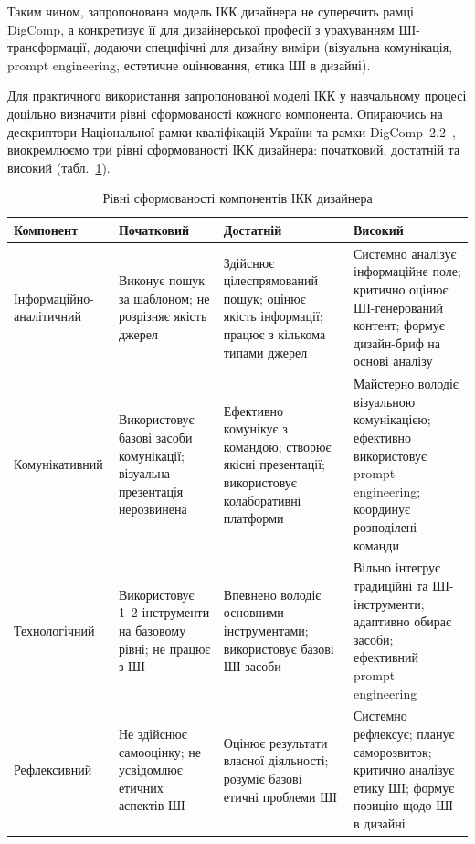 Таким чином, запропонована модель ІКК дизайнера не суперечить рамці DigComp, а конкретизує її для дизайнерської професії з урахуванням ШІ-трансформації, додаючи специфічні для дизайну виміри (візуальна комунікація, prompt engineering, естетичне оцінювання, етика ШІ в дизайні).


Для практичного використання запропонованої моделі ІКК у навчальному процесі доцільно визначити рівні сформованості кожного компонента. Опираючись на дескриптори Національної рамки кваліфікацій України та рамки DigComp~2.2~\cite{Vuorikari2022DigComp}, виокремлюємо три рівні сформованості ІКК дизайнера: початковий, достатній та високий (табл.~\ref{tab:ikk_levels}).

\begin{table}[!h]
\centering
\caption{Рівні сформованості компонентів ІКК дизайнера}
\label{tab:ikk_levels}
\small
\begin{tabular}{|p{2.7cm}|p{3.5cm}|p{3.5cm}|p{3.5cm}|}
\hline
\textbf{Компонент} & \textbf{Початковий} & \textbf{Достатній} & \textbf{Високий} \\
\hline
Інформаційно-аналітичний & Виконує пошук за шаблоном; не розрізняє якість джерел & Здійснює цілеспрямований пошук; оцінює якість інформації; працює з кількома типами джерел & Системно аналізує інформаційне поле; критично оцінює ШІ-генерований контент; формує дизайн-бриф на основі аналізу \\
\hline
Комунікативний & Використовує базові засоби комунікації; візуальна презентація нерозвинена & Ефективно комунікує з командою; створює якісні презентації; використовує колаборативні платформи & Майстерно володіє візуальною комунікацією; ефективно використовує prompt engineering; координує розподілені команди \\
\hline
Технологічний & Використовує 1--2 інструменти на базовому рівні; не працює з ШІ & Впевнено володіє основними інструментами; використовує базові ШІ-засоби & Вільно інтегрує традиційні та ШІ-інструменти; адаптивно обирає засоби; ефективний prompt engineering \\
\hline
Рефлексивний & Не здійснює самооцінку; не усвідомлює етичних аспектів ШІ & Оцінює результати власної діяльності; розуміє базові етичні проблеми ШІ & Системно рефлексує; планує саморозвиток; критично аналізує етику ШІ; формує позицію щодо ШІ в дизайні \\
\hline
\end{tabular}
\end{table}

